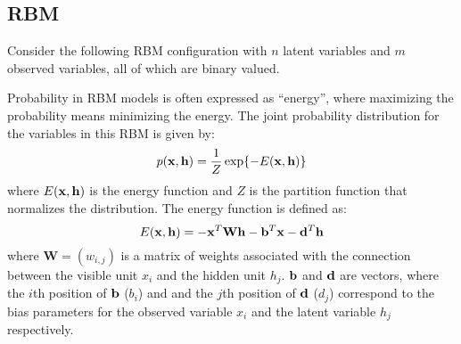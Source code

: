 \documentclass[11pt]{article}
\newcommand{\vx}{{\bf x}}
\newcommand{\vh}{{\bf h}}
\newcommand{\vb}{{\bf b}}
\newcommand{\vd}{{\bf d}}
\begin{document}
\subsection{RBM} %
Consider the following RBM configuration with $n$ latent variables and $m$ observed variables, all of which are binary valued.
\begin{figure*}[h]
	\begin{center}
		
			\label{fig:rbm}
		\end{center}
\end{figure*}

Probability in RBM models is often expressed as ``energy'', where maximizing the probability means minimizing the energy. The joint probability
distribution for the variables in this RBM is given by:
\begin{equation}
\label{eq:joint}
p(\vx, \vh) = \frac{1}{Z} \exp\{-E(\vx, \vh)\}
\end{equation}
where $E(\vx, \vh)$ is the energy function and $Z$ is the partition function that normalizes the distribution. The energy function is defined as:
\begin{equation}
E(\vx, \vh) = -\vx^T \mathbf{W}\vh - \vb^T\vx - \vd^T\vh
\end{equation}
where $\mathbf{W} = (w_{i,j})$ is a matrix of weights associated with the connection between the visible unit $x_i$ and the hidden unit $h_j$.
$\vb$ and $\vd$ are vectors, where the $i$th position of $\vb$ ($b_i$) and and the $j$th position of $\vd$ ($d_j$) correspond
to the bias parameters for the observed variable $x_i$ and the latent variable $h_j$  respectively.
\end{document}
